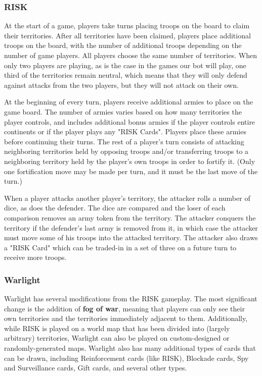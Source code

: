 \documentclass[a4paper,11pt]{article}
\begin{document}
\subsubsection{RISK}
At the start of a game, players take turns placing troops on the board to claim
their territories.  After all territories have been claimed, players place
additional troops on the board, with the number of additional troops depending on
the number of game players.  All players choose the same number of territories.
When only two players are playing, as is the case in the games our bot will play,
one third of the territories remain neutral, which means that they will only defend
against attacks from the two players, but they will not attack on their own.

At the beginning of every turn, players receive additional armies to place on the 
game board.  The number of armies varies based on how many territories the player 
controls, and includes additional bonus armies if the player controls entire 
continents or if the player plays any "RISK Cards".  Players place these armies before continuing their turns.  The rest of 
a player's turn consists of attacking neighboring territories held by opposing 
troops and/or transferring troops to a neighboring territory held by the player's 
own troops in order to fortify it. (Only one fortification move may be made per turn, and it must be the last move of the turn.)

When a player attacks another player's territory, the attacker rolls a number of dice, as does the defender.  The dice are compared and the loser of each comparison removes an army token from the territory.  The attacker conquers the territory if the defender's last army is removed from it, in which case the attacker must move some of his troops into the attacked territory.  The attacker also draws a "RISK Card" which can be traded-in in a set of three on a future turn to receive more troops.

\subsubsection{Warlight}
Warlight has several modifications from the RISK gameplay.  The most significant 
change is the addition of \textbf{fog of war}, meaning that players can only see 
their own territories and the territories immediately adjacent to them.  
Additionally, while RISK is played on a world map that has been divided into 
(largely arbitrary) territories, Warlight can also be played on custom-designed or 
randomly-generated maps.  Warlight also has many additional types of cards that can 
be drawn, including Reinforcement cards (like RISK), Blockade cards, Spy and 
Surveillance cards, Gift cards, and several other types.
\end{document}

